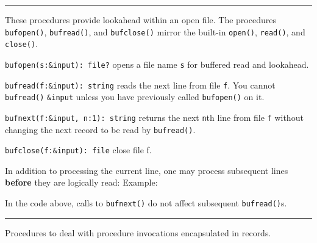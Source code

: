 
\vspace{0.25cm}\hrule{}

These procedures provide lookahead within an open file. The procedures
\texttt{bufopen()}, \texttt{bufread()}, and \texttt{bufclose()} mirror
the built-in \texttt{open()}, \texttt{read()}, and \texttt{close()}.

\texttt{bufopen(s:\&input): file?} opens a file name \texttt{s} for
buffered read and lookahead.

\texttt{bufread(f:\&input): string} reads the next line from file
\texttt{f}. You cannot \texttt{bufread()} \texttt{\&input} unless you
have previously called \texttt{bufopen()} on it.

\texttt{bufnext(f:\&input, n:1): string} returns the next \texttt{n}th
line from file \texttt{f} without changing the next record to be read
by \texttt{bufread()}.

\texttt{bufclose(f:\&input): file} close file f.

In addition to processing the current line, one may process subsequent
lines \textbf{before} they are logically read: Example:


In the code above, calls to \texttt{bufnext()} do not affect subsequent
\texttt{bufread()}{\textquotesingle}s.

\vspace{0.25cm}\hrule{}

Procedures to deal with procedure
invocations encapsulated in records.

